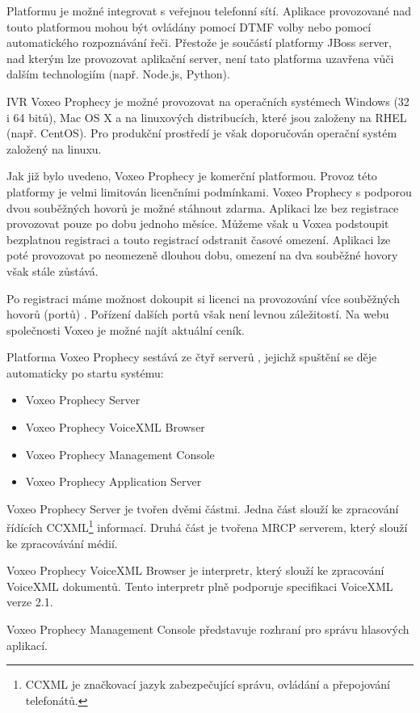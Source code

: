\documentclass[ing,male,java,dept460,twoside]{diploma}						%
\begin{document}
Platformu je možné integrovat s veřejnou telefonní sítí. Aplikace provozované nad touto platformou mohou být ovládány pomocí DTMF volby nebo pomocí automatického rozpoznávání řeči. Přestože je součástí platformy JBoss server, nad kterým lze provozovat aplikační server, není tato platforma uzavřena vůči dalším technologiím (např. Node.js, Python).

IVR Voxeo Prophecy je možné provozovat na operačních systémech Windows (32 i 64 bitů), Mac OS X a na linuxových distribucích, které jsou založeny na RHEL (např. CentOS). Pro produkční prostředí je však doporučován operační systém založený na linuxu.

Jak již bylo uvedeno, Voxeo Prophecy je komerční platformou. Provoz této platformy je velmi limitován licenčními podmínkami. Voxeo Prophecy s podporou dvou souběžných hovorů je možné stáhnout zdarma. Aplikaci lze bez registrace provozovat pouze po dobu jednoho měsíce. Můžeme však u Voxea podstoupit bezplatnou registraci a touto registrací odstranit časové omezení. Aplikaci lze poté provozovat po neomezeně dlouhou dobu, omezení na dva souběžné hovory však stále zůstává.

Po registraci máme možnost dokoupit si licenci na provozování více souběžných hovorů (portů) \cite{vxml_org}. Pořízení dalších portů však není levnou záležitostí. Na webu společnosti Voxeo je možné najít aktuální ceník.

Platforma Voxeo Prophecy sestává ze čtyř serverů \cite{vxml_interpreters}, jejichž spuštění se děje automaticky po startu systému:

\begin{itemize}
\item Voxeo Prophecy Server
\item Voxeo Prophecy VoiceXML Browser
\item Voxeo Prophecy Management Console
\item Voxeo Prophecy Application Server
\end{itemize}

Voxeo Prophecy Server je tvořen dvěmi částmi. Jedna část slouží ke zpracování řídících CCXML\footnote{CCXML je značkovací jazyk zabezpečující správu, ovládání a přepojování telefonátů.} informací. Druhá část je tvořena MRCP serverem, který slouží ke zpracovávání médií.

Voxeo Prophecy VoiceXML Browser je interpretr, který slouží ke zpracování VoiceXML dokumentů. Tento interpretr plně podporuje specifikaci VoiceXML verze 2.1.

Voxeo Prophecy Management Console představuje rozhraní pro správu hlasových aplikací.
\end{document}

